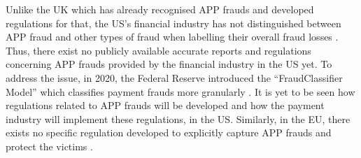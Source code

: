 Unlike the UK which has already recognised APP frauds and developed regulations for that,  the US's financial industry has not distinguished between APP fraud and other types of fraud when labelling their overall fraud losses \cite{P20-report}. Thus, there exist no publicly available accurate reports and regulations concerning APP frauds provided by the financial industry in the US yet.  To address the issue, in 2020, the Federal Reserve introduced the ``FraudClassifier Model'' which classifies payment frauds more granularly \cite{Fraud-Classifier}. It is yet to be seen how regulations related to APP frauds will be developed and how the payment industry will implement these regulations, in the US. Similarly, in the EU, there  exists no specific regulation developed 
%
%
%
to explicitly capture APP frauds and protect the victims \cite{kjorven2020pays,McIlroy2021}.


















